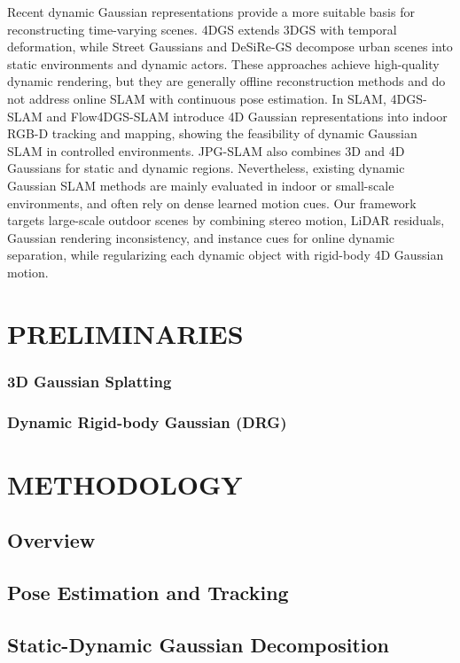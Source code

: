 \documentclass[letterpaper, 10 pt, conference]{ieeeconf}  %
\begin{document}
Recent dynamic Gaussian representations provide a more suitable basis for reconstructing time-varying scenes. 4DGS \cite{4dgs} extends 3DGS with temporal deformation, while Street Gaussians \cite{street-gaussians} and DeSiRe-GS \cite{desire-gs} decompose urban scenes into static environments and dynamic actors. These approaches achieve high-quality dynamic rendering, but they are generally offline reconstruction methods and do not address online SLAM with continuous pose estimation. In SLAM, 4DGS-SLAM \cite{4dgs-slam} and Flow4DGS-SLAM \cite{flow4dgs-slam} introduce 4D Gaussian representations into indoor RGB-D tracking and mapping, showing the feasibility of dynamic Gaussian SLAM in controlled environments. JPG-SLAM \cite{jpg-slam} also combines 3D and 4D Gaussians for static and dynamic regions. Nevertheless, existing dynamic Gaussian SLAM methods are mainly evaluated in indoor or small-scale environments, and often rely on dense learned motion cues. Our framework targets large-scale outdoor scenes by combining stereo motion, LiDAR residuals, Gaussian rendering inconsistency, and instance cues for online dynamic separation, while regularizing each dynamic object with rigid-body 4D Gaussian motion.

\section{PRELIMINARIES}

\subsubsection{3D Gaussian Splatting}

\subsubsection{Dynamic Rigid-body Gaussian (DRG)}

\section{METHODOLOGY}
\subsection{Overview}
\subsection{Pose Estimation and Tracking}

\subsection{Static-Dynamic Gaussian Decomposition}
\end{document}
